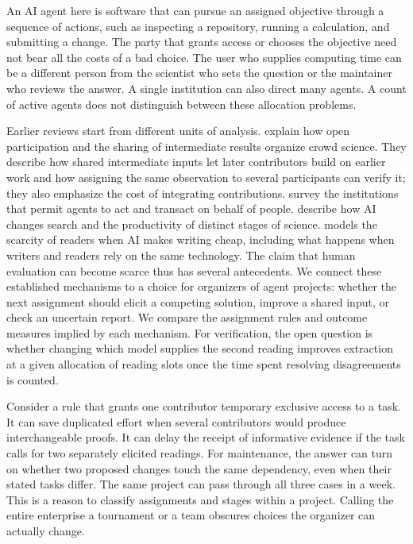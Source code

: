 \documentclass[11pt,letterpaper]{article}
\begin{document}
An AI agent here is software that can pursue an assigned objective through a sequence of actions, such as inspecting a repository, running a calculation, and submitting a change. The party that grants access or chooses the objective need not bear all the costs of a bad choice. The user who supplies computing time can be a different person from the scientist who sets the question or the maintainer who reviews the answer. A single institution can also direct many agents. A count of active agents does not distinguish between these allocation problems.

Earlier reviews start from different units of analysis. \citet{franzoni} explain how open participation and the sharing of intermediate results organize crowd science. They describe how shared intermediate inputs let later contributors build on earlier work and how assigning the same observation to several participants can verify it; they also emphasize the cost of integrating contributions. \citet{hadfield} survey the institutions that permit agents to act and transact on behalf of people. \citet{agrawal} describe how AI changes search and the productivity of distinct stages of science. \citet{kuhle} models the scarcity of readers when AI makes writing cheap, including what happens when writers and readers rely on the same technology. The claim that human evaluation can become scarce thus has several antecedents. We connect these established mechanisms to a choice for organizers of agent projects: whether the next assignment should elicit a competing solution, improve a shared input, or check an uncertain report. We compare the assignment rules and outcome measures implied by each mechanism. For verification, the open question is whether changing which model supplies the second reading improves extraction at a given allocation of reading slots once the time spent resolving disagreements is counted.

Consider a rule that grants one contributor temporary exclusive access to a task. It can save duplicated effort when several contributors would produce interchangeable proofs. It can delay the receipt of informative evidence if the task calls for two separately elicited readings. For maintenance, the answer can turn on whether two proposed changes touch the same dependency, even when their stated tasks differ. The same project can pass through all three cases in a week. This is a reason to classify assignments and stages within a project. Calling the entire enterprise a tournament or a team obscures choices the organizer can actually change.
\end{document}
